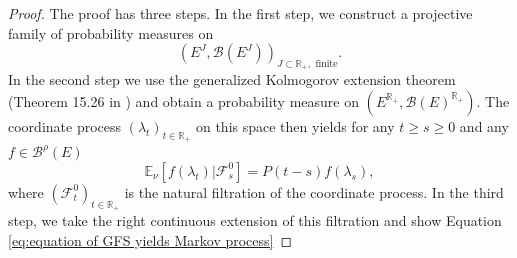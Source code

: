 \documentclass[a4paper,12pt]{article}
\theoremstyle{definition}
\theoremstyle{remark}
\numberwithin{equation}{section}
\numberwithin{theorem}{section}
\begin{document}
\begin{proof}
The proof has three steps. In the first step, we construct a projective
family of probability measures 
on 
\[
\left(E^{J},\mathcal{B}\left(E^{J}\right)\right)_{J\subset\mathbb{R}_{+},\text{ finite}}.
\]
In the second step we use the generalized Kolmogorov extension theorem (Theorem 15.26 in \cite{AlB}) and obtain a probability measure on $\left(E^{\mathbb{R}_{+}},\mathcal{B}(E)^{\mathbb{R}_{+}}\right)$.
The coordinate process $\left(\lambda_{t}\right)_{t\in\mathbb{R}_{+}}$
on this space then yields for any $t\geq s\geq0$ and any $f\in\mathcal{\mathscr{B}}^{\rho}(E)$
\begin{equation}
\mathbb{E}_{\nu}\left[\left.f(\lambda_{t})\right|\mathcal{F}_{s}^{0}\right]=P\left(t-s\right)f(\lambda_{s}),\label{eq:conditional expectation gFp, natural filtration}
\end{equation}
 where $\left(\mathcal{F}_{t}^{0}\right)_{t\in\mathbb{R}_{+}}$ is
the natural filtration of the coordinate process. In the third step,
we take the right continuous extension of this filtration and show
Equation \eqref{eq:equation of GFS yields Markov process}



\end{proof}
\end{document}
